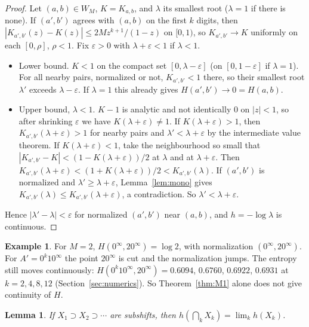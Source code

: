 \documentclass[11pt]{amsart}
\newtheorem{lemma}[theorem]{Lemma}
\theoremstyle{definition}
\newtheorem{example}[theorem]{Example}
\theoremstyle{remark}
\begin{document}
\begin{proof}
Let $(a,b)\in W_M$, $K=K_{a,b}$, and $\lambda$ its smallest root ($\lambda=1$ if there is none). If $(a',b')$ agrees with $(a,b)$ on the first $k$ digits, then $|K_{a',b'}(z)-K(z)|\le2Mz^{k+1}/(1-z)$ on $[0,1)$, so $K_{a',b'}\to K$ uniformly on each $[0,\rho]$, $\rho<1$. Fix $\varepsilon>0$ with $\lambda+\varepsilon<1$ if $\lambda<1$.
\begin{itemize}
\item Lower bound. $K<1$ on the compact set $[0,\lambda-\varepsilon]$ (on $[0,1-\varepsilon]$ if $\lambda=1$). For all nearby pairs, normalized or not, $K_{a',b'}<1$ there, so their smallest root $\lambda'$ exceeds $\lambda-\varepsilon$. If $\lambda=1$ this already gives $H(a',b')\to0=H(a,b)$.
\item Upper bound, $\lambda<1$. $K-1$ is analytic and not identically $0$ on $|z|<1$, so after shrinking $\varepsilon$ we have $K(\lambda+\varepsilon)\ne1$. If $K(\lambda+\varepsilon)>1$, then $K_{a',b'}(\lambda+\varepsilon)>1$ for nearby pairs and $\lambda'<\lambda+\varepsilon$ by the intermediate value theorem. If $K(\lambda+\varepsilon)<1$, take the neighbourhood so small that $|K_{a',b'}-K|<(1-K(\lambda+\varepsilon))/2$ at $\lambda$ and at $\lambda+\varepsilon$. Then $K_{a',b'}(\lambda+\varepsilon)<(1+K(\lambda+\varepsilon))/2<K_{a',b'}(\lambda)$. If $(a',b')$ is normalized and $\lambda'\ge\lambda+\varepsilon$, Lemma~\ref{lem:mono} gives $K_{a',b'}(\lambda)\le K_{a',b'}(\lambda+\varepsilon)$, a contradiction. So $\lambda'<\lambda+\varepsilon$.
\end{itemize}
Hence $|\lambda'-\lambda|<\varepsilon$ for normalized $(a',b')$ near $(a,b)$, and $h=-\log\lambda$ is continuous.
\end{proof}

\begin{example}\label{ex:jump}
For $M=2$, $H(0^\infty,20^\infty)=\log2$, with normalization $(0^\infty,20^\infty)$. For $A'=0^k10^\infty$ the point $20^\infty$ is cut and the normalization jumps. The entropy still moves continuously: $H(0^k10^\infty,20^\infty)=0.6094$, $0.6760$, $0.6922$, $0.6931$ at $k=2,4,8,12$ (Section~\ref{sec:numerics}). So Theorem~\ref{thm:M1} alone does not give continuity of $H$.
\end{example}

\begin{lemma}\label{lem:intersect}
If $X_1\supset X_2\supset\cdots$ are subshifts, then $h(\bigcap_kX_k)=\lim_kh(X_k)$.
\end{lemma}
\end{document}
